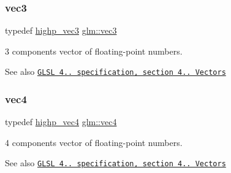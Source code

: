 \subsubsection{\texorpdfstring{vec3}{vec3}}
{\footnotesize\ttfamily typedef \hyperlink{group__core__precision_ga37ff190d92f9be26223a5de4153b9133}{highp\+\_\+vec3} \hyperlink{group__core__types_ga1c47e8b3386109bc992b6c48e91b0be7}{glm\+::vec3}}

3 components vector of floating-\/point numbers.

\begin{DoxySeeAlso}{See also}
\href{http://www.opengl.org/registry/doc/GLSLangSpec.4.20.8.pdf}{\tt G\+L\+SL 4.. specification, section 4.. Vectors} 
\end{DoxySeeAlso}
\mbox{\label{group__core__types_ga5881b1b022d7fd1b7218f5916532dd02}} 
\subsubsection{\texorpdfstring{vec4}{vec4}}
{\footnotesize\ttfamily typedef \hyperlink{group__core__precision_ga27638826fa491205403b39198c49e9f5}{highp\+\_\+vec4} \hyperlink{group__core__types_ga5881b1b022d7fd1b7218f5916532dd02}{glm\+::vec4}}

4 components vector of floating-\/point numbers.

\begin{DoxySeeAlso}{See also}
\href{http://www.opengl.org/registry/doc/GLSLangSpec.4.20.8.pdf}{\tt G\+L\+SL 4.. specification, section 4.. Vectors} 
\end{DoxySeeAlso}
